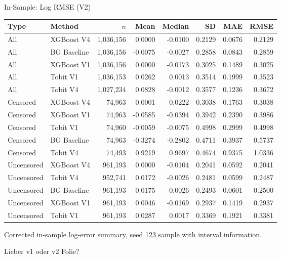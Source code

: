 \documentclass[10pt]{beamer}
\begin{document}
\begin{frame}{In-Sample: Log RMSE (V2)}
\centering
\tiny
\begin{tabular}{llrrrrrr}
\toprule
Type & Method & $n$ & Mean & Median & SD & MAE & RMSE \\
\midrule
All & XGBoost V4 & 1,036,156 & 0.0000 & -0.0100 & 0.2129 & 0.0676 & 0.2129 \\
All & BG Baseline & 1,036,156 & -0.0075 & -0.0027 & 0.2858 & 0.0843 & 0.2859 \\
All & XGBoost V1 & 1,036,156 & 0.0000 & -0.0173 & 0.3025 & 0.1489 & 0.3025 \\
All & Tobit V1 & 1,036,153 & 0.0262 & 0.0013 & 0.3514 & 0.1999 & 0.3523 \\
All & Tobit V4 & 1,027,234 & 0.0828 & -0.0012 & 0.3577 & 0.1236 & 0.3672 \\
\midrule
Censored & XGBoost V4 & 74,963 & 0.0001 & 0.0222 & 0.3038 & 0.1763 & 0.3038 \\
Censored & XGBoost V1 & 74,963 & -0.0585 & -0.0394 & 0.3942 & 0.2390 & 0.3986 \\
Censored & Tobit V1 & 74,960 & -0.0059 & -0.0075 & 0.4998 & 0.2999 & 0.4998 \\
Censored & BG Baseline & 74,963 & -0.3274 & -0.2802 & 0.4711 & 0.3937 & 0.5737 \\
Censored & Tobit V4 & 74,493 & 0.9219 & 0.9697 & 0.4674 & 0.9375 & 1.0336 \\
\midrule
Uncensored & XGBoost V4 & 961,193 & 0.0000 & -0.0104 & 0.2041 & 0.0592 & 0.2041 \\
Uncensored & Tobit V4 & 952,741 & 0.0172 & -0.0026 & 0.2481 & 0.0599 & 0.2487 \\
Uncensored & BG Baseline & 961,193 & 0.0175 & -0.0026 & 0.2493 & 0.0601 & 0.2500 \\
Uncensored & XGBoost V1 & 961,193 & 0.0046 & -0.0169 & 0.2937 & 0.1419 & 0.2937 \\
Uncensored & Tobit V1 & 961,193 & 0.0287 & 0.0017 & 0.3369 & 0.1921 & 0.3381 \\
\bottomrule
\end{tabular}

\vspace{0.2cm}
\small
Corrected in-sample log-error summary, seed 123 sample with interval information.

Lieber v1 oder v2 Folie?
\end{frame}
\end{document}
